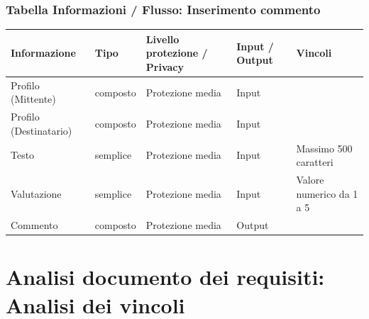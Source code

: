 \documentclass[12pt,a4paper]{report}
\begin{document}
\subsubsection{Tabella Informazioni / Flusso: Inserimento commento}
\begin{tabularx}{\textwidth}{|X|X|X|X|X|}
    \hline
    \rowcolor{studyColor} \textbf{Informazione} & \textbf{Tipo} & \textbf{Livello protezione / Privacy} & \textbf{Input / Output} & \textbf{Vincoli} \\ \hline
    \endhead
    Profilo (Mittente) & composto & Protezione media & Input & \\ \hline
    Profilo (Destinatario) & composto & Protezione media & Input & \\ \hline
    Testo & semplice & Protezione media & Input & Massimo 500 caratteri \\ \hline
    Valutazione & semplice & Protezione media & Input & Valore numerico da 1 a 5 \\ \hline
    Commento & composto & Protezione media & Output & \\ \hline
\end{tabularx}

\newpage
\section{Analisi documento dei requisiti: Analisi dei vincoli}
\end{document}
